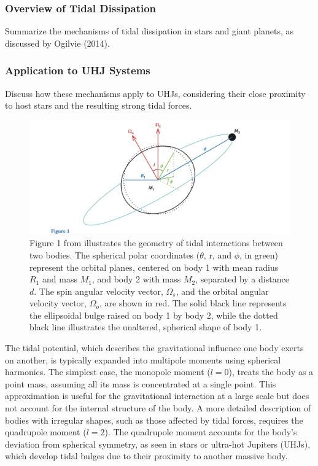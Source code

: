 \documentclass[oneside,12pt]{amsart}
\numberwithin{page}{section}
\begin{document}
\subsubsection{Overview of Tidal Dissipation}
Summarize the mechanisms of tidal dissipation in stars and giant planets, as discussed by Ogilvie (2014).

\subsubsection{Application to UHJ Systems}
Discuss how these mechanisms apply to UHJs, considering their close proximity to host stars and the resulting strong tidal forces.

\begin{figure}[htbp]
    \centering
    \includegraphics[width=\linewidth]{figs/ogilvie_fig1.png}
    \caption{Figure 1 from \citet{ogilvie2014tidal} illustrates the geometry of tidal interactions between two bodies. The spherical polar coordinates ($\theta$, r, and $\phi$, in green) represent the orbital planes, centered on body 1 with mean radius $R_1$ and mass $M_1$, and body 2 with mass $M_2$, separated by a distance $d$. The spin angular velocity vector, $\Omega_s$, and the orbital angular velocity vector, $\Omega_o$, are shown in red. The solid black line represents the ellipsoidal bulge raised on body 1 by body 2, while the dotted black line illustrates the unaltered, spherical shape of body 1.}
    \label{fig:ogilvie-fig1}
\end{figure}

The tidal potential, which describes the gravitational influence one body exerts on another, is typically expanded into multipole moments using spherical harmonics. The simplest case, the monopole moment ($l = 0$), treats the body as a point mass, assuming all its mass is concentrated at a single point. This approximation is useful for the gravitational interaction at a large scale but does not account for the internal structure of the body. A more detailed description of bodies with irregular shapes, such as those affected by tidal forces, requires the quadrupole moment ($l = 2$). The quadrupole moment accounts for the body's deviation from spherical symmetry, as seen in stars or ultra-hot Jupiters (UHJs), which develop tidal bulges due to their proximity to another massive body.
\end{document}
